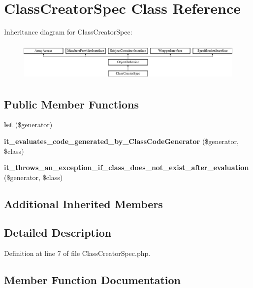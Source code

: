 \section{Class\+Creator\+Spec Class Reference}
\label{classspec_1_1_prophecy_1_1_doubler_1_1_generator_1_1_class_creator_spec}
Inheritance diagram for Class\+Creator\+Spec\+:\begin{figure}[H]
\begin{center}
\leavevmode
\includegraphics[height=1.953488cm]{classspec_1_1_prophecy_1_1_doubler_1_1_generator_1_1_class_creator_spec}
\end{center}
\end{figure}
\subsection*{Public Member Functions}
\begin{DoxyCompactItemize}
\item 
{\bf let} (\$generator)
\item 
{\bf it\+\_\+evaluates\+\_\+code\+\_\+generated\+\_\+by\+\_\+\+Class\+Code\+Generator} (\$generator, \$class)
\item 
{\bf it\+\_\+throws\+\_\+an\+\_\+exception\+\_\+if\+\_\+class\+\_\+does\+\_\+not\+\_\+exist\+\_\+after\+\_\+evaluation} (\$generator, \$class)
\end{DoxyCompactItemize}
\subsection*{Additional Inherited Members}


\subsection{Detailed Description}


Definition at line 7 of file Class\+Creator\+Spec.\+php.



\subsection{Member Function Documentation}
